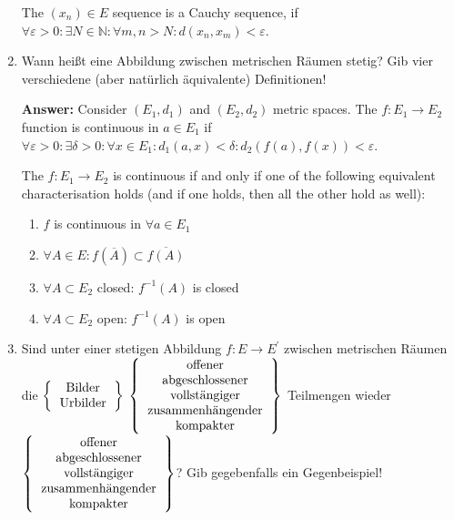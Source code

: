 \documentclass[11pt]{article}
\newcommand{\NN}[0]{\mathbb{N}}
\begin{document}
\begin{enumerate}
    The $(x_n) \in E$ sequence is a Cauchy sequence, if $\forall \varepsilon > 0\colon \exists N \in \NN\colon \forall m, n > N\colon d(x_n, x_m) < \varepsilon$.

    \item Wann heißt eine Abbildung zwischen metrischen Räumen stetig? Gib vier verschiedene (aber natürlich äquivalente) Definitionen!

    \textbf{Answer:} Consider $(E_1, d_1)$ and $(E_2, d_2)$ metric spaces. The $f\colon E_1 \to E_2$ function is continuous in $a \in E_1$ if $\forall \varepsilon > 0\colon \exists \delta > 0\colon \forall x \in E_1\colon d_1(a, x) < \delta\colon d_2(f(a), f(x)) < \varepsilon$.

    The $f\colon E_1 \to E_2$ is continuous if and only if one of the following equivalent characterisation holds (and if one holds, then all the other hold as well):
    \begin{enumerate}
        \item $f$ is continuous in $\forall a \in E_1$
        \item $\forall A \in E\colon f(\overline{A}) \subset \overline{f(A)}$
        \item $\forall A \subset E_2$ closed: $f^{-1}(A)$ is closed
        \item $\forall A \subset E_2$ open: $f^{-1}(A)$ is open
    \end{enumerate}

    \item Sind unter einer stetigen Abbildung $f: E \to E^\prime$ zwischen metrischen Räumen die $\left\{\begin{tabular}{c}
        \text{Bilder}\\
        \text{Urbilder}
    \end{tabular}\right\}$ $\left\{\begin{tabular}{c}
    \text{offener}\\
    \text{abgeschlossener}\\
    \text{vollstängiger}\\
    \text{zusammenhängender}\\
    \text{kompakter}
    \end{tabular}\right\}$ Teilmengen wieder $\left\{\begin{tabular}{c}
        \text{offener}\\
        \text{abgeschlossener}\\
        \text{vollstängiger}\\
        \text{zusammenhängender}\\
        \text{kompakter}
        \end{tabular}\right\}$?
    Gib gegebenfalls ein Gegenbeispiel!


\end{enumerate}
\end{document}
